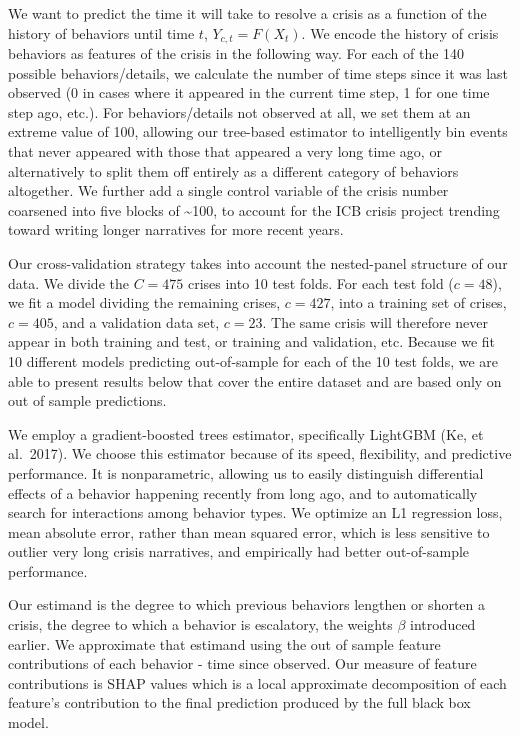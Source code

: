 \documentclass[
  letterpaper,
  DIV=11,
  numbers=noendperiod]{scrartcl}
\begin{document}
We want to predict the time it will take to resolve a crisis as a
function of the history of behaviors until time \(t\),
\(Y_{c,t}=F(X_t)\). We encode the history of crisis behaviors as
features of the crisis in the following way. For each of the 140
possible behaviors/details, we calculate the number of time steps since
it was last observed (0 in cases where it appeared in the current time
step, 1 for one time step ago, etc.). For behaviors/details not observed
at all, we set them at an extreme value of 100, allowing our tree-based
estimator to intelligently bin events that never appeared with those
that appeared a very long time ago, or alternatively to split them off
entirely as a different category of behaviors altogether. We further add
a single control variable of the crisis number coarsened into five
blocks of \textasciitilde100, to account for the ICB crisis project
trending toward writing longer narratives for more recent years.

Our cross-validation strategy takes into account the nested-panel
structure of our data. We divide the \(C=475\) crises into 10 test
folds. For each test fold (\(c=48\)), we fit a model dividing the
remaining crises, \(c=427\), into a training set of crises, \(c=405\),
and a validation data set, \(c=23\). The same crisis will therefore
never appear in both training and test, or training and validation, etc.
Because we fit 10 different models predicting out-of-sample for each of
the 10 test folds, we are able to present results below that cover the
entire dataset and are based only on out of sample predictions.

We employ a gradient-boosted trees estimator, specifically LightGBM (Ke,
et al.~2017). We choose this estimator because of its speed,
flexibility, and predictive performance. It is nonparametric, allowing
us to easily distinguish differential effects of a behavior happening
recently from long ago, and to automatically search for interactions
among behavior types. We optimize an L1 regression loss, mean absolute
error, rather than mean squared error, which is less sensitive to
outlier very long crisis narratives, and empirically had better
out-of-sample performance.

Our estimand is the degree to which previous behaviors lengthen or
shorten a crisis, the degree to which a behavior is escalatory, the
weights \(\beta\) introduced earlier. We approximate that estimand using
the out of sample feature contributions of each behavior - time since
observed. Our measure of feature contributions is SHAP values which is a
local approximate decomposition of each feature's contribution to the
final prediction produced by the full black box model.
\end{document}
